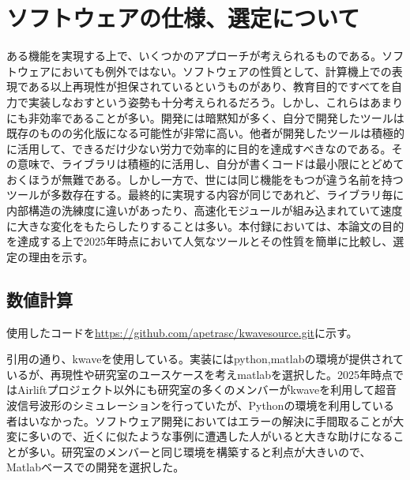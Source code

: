 \documentclass[uplatex]{suribt}
\begin{document}
\chapter{ソフトウェアの仕様、選定について}
ある機能を実現する上で、いくつかのアプローチが考えられるものである。ソフトウェアにおいても例外ではない。ソフトウェアの性質として、計算機上での表現である以上再現性が担保されているというものがあり、教育目的ですべてを自力で実装しなおすという姿勢も十分考えられるだろう。しかし、これらはあまりにも非効率であることが多い。開発には暗黙知が多く、自分で開発したツールは既存のものの劣化版になる可能性が非常に高い。他者が開発したツールは積極的に活用して、できるだけ少ない労力で効率的に目的を達成すべきなのである。その意味で、ライブラリは積極的に活用し、自分が書くコードは最小限にとどめておくほうが無難である。しかし一方で、世には同じ機能をもつが違う名前を持つツールが多数存在する。最終的に実現する内容が同じであれど、ライブラリ毎に内部構造の洗練度に違いがあったり、高速化モジュールが組み込まれていて速度に大きな変化をもたらしたりすることは多い。本付録においては、本論文の目的を達成する上で2025年時点において人気なツールとその性質を簡単に比較し、選定の理由を示す。
\section{数値計算}
使用したコードを\url{https://github.com/apetrasc/kwavesource.git}に示す。\par
引用の通り、kwaveを使用している。実装にはpython,matlabの環境が提供されているが、再現性や研究室のユースケースを考えmatlabを選択した。2025年時点ではAirliftプロジェクト以外にも研究室の多くのメンバーがkwaveを利用して超音波信号波形のシミュレーションを行っていたが、Pythonの環境を利用している者はいなかった。ソフトウェア開発においてはエラーの解決に手間取ることが大変に多いので、近くに似たような事例に遭遇した人がいると大きな助けになることが多い。研究室のメンバーと同じ環境を構築すると利点が大きいので、Matlabベースでの開発を選択した。
\end{document}
